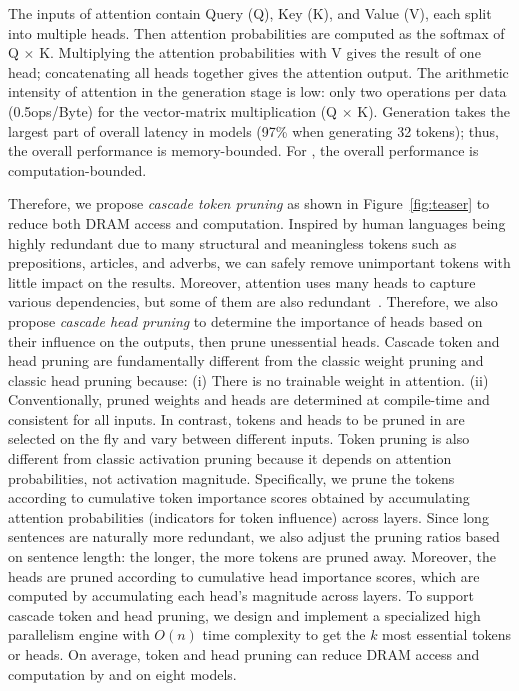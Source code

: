 The inputs of attention contain Query (Q), Key (K), and Value (V), each split into multiple heads.
Then attention probabilities are computed as the softmax of Q $\times$ K. Multiplying the attention probabilities with V gives the result of one head; concatenating all heads together gives the attention output.
The arithmetic intensity of attention in the generation stage is low: only two operations per data (0.5ops/Byte) for the vector-matrix multiplication (Q $\times$ K). Generation takes the largest part of overall latency in \gpttwo models (97\% when generating 32 tokens); thus, the overall performance is memory-bounded. For \bert, the overall performance is computation-bounded.


Therefore, we propose \emph{cascade token pruning} as shown in Figure~\ref{fig:teaser} to reduce both DRAM access and computation. Inspired by human languages being highly redundant due to many structural and meaningless tokens such as prepositions, articles, and adverbs, we can safely remove unimportant tokens with little impact on the results. Moreover, attention uses many heads to capture various dependencies, but some of them are also redundant~\cite{voita2019analyzing}. Therefore, we also propose \emph{cascade head pruning} to determine the importance of heads based on their influence on the outputs, then prune unessential heads. Cascade token and head pruning are fundamentally different from the classic weight pruning and classic head pruning because: (i) There is no trainable weight in attention. (ii) Conventionally, pruned weights and heads are determined at compile-time and consistent for all inputs. In contrast, tokens and heads to be pruned in \name are selected on the fly and vary between different inputs. Token pruning is also different from classic activation pruning because it depends on attention probabilities, not activation magnitude. Specifically, we prune the tokens according to cumulative token importance scores obtained by accumulating attention probabilities (indicators for token influence) across layers. Since long sentences are naturally more redundant, we also adjust the pruning ratios based on sentence length: the longer, the more tokens are pruned away. Moreover, the heads are pruned according to cumulative head importance scores, which are computed by accumulating each head's magnitude across layers. 
To support cascade token and head pruning, we design and implement a specialized high parallelism \topk engine with $O(n)$ time complexity to get the $k$ most essential tokens or heads. On average, token and head pruning can reduce DRAM access and computation by \prunegpttwodramsaving\x and \hpdramsaving\x on eight \gpttwo models.

